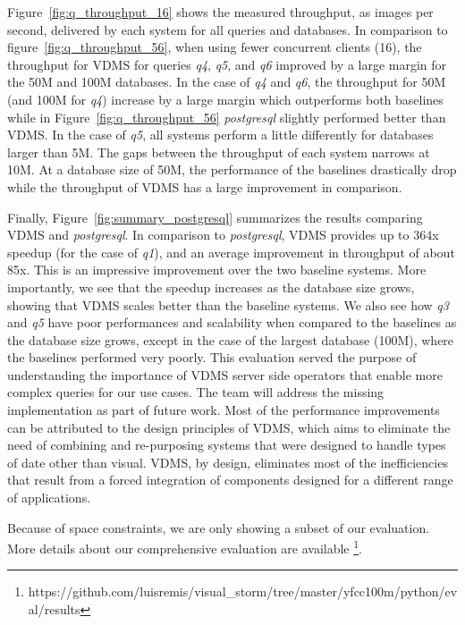 Figure~\ref{fig:q_throughput_16} shows the measured throughput,
as images per second, delivered by each system for all queries and databases.
In comparison to figure~\ref{fig:q_throughput_56},
when using fewer concurrent clients (16),
the throughput for VDMS for queries \textit{q4}, \textit{q5}, and \textit{q6}
improved by a large margin for the 50M and 100M databases.
In the case of \textit{q4} and \textit{q6},
the throughput for 50M (and 100M for \textit{q4})
increase by a large margin which outperforms both baselines while in
Figure~\ref{fig:q_throughput_56} \textit{postgresql} slightly performed better than VDMS.
In the case of \textit{q5}, all systems perform a little differently for databases
larger than 5M.
The gaps between the throughput of each system narrows at 10M.
At a database size of 50M, the performance of the baselines drastically drop
while the throughput of VDMS has a large improvement in comparison.





Finally, Figure~\ref{fig:summary_postgresql} summarizes the results
comparing VDMS and \textit{postgresql}.
In comparison to \textit{postgresql}, VDMS provides up to 364x speedup
(for the case of \textit{q1}),
and an average improvement in throughput of about 85x.
This is an impressive improvement over the two baseline systems.
More importantly, we see that the speedup increases as the database size grows,
showing that VDMS scales better than the baseline systems.
We also see how \textit{q3} and \textit{q5} have poor performances and scalability
when compared to the baselines as the database size grows, except in the
case of the largest database (100M), where the baselines performed very poorly.
This evaluation served the
purpose of understanding the importance of VDMS server side operators
that enable more complex queries for our use cases.
The team will address the missing implementation as part of future work.
Most of the performance improvements can be attributed to the design
principles of VDMS, which aims to eliminate the need of combining and
re-purposing systems that were designed to handle types of date other than visual.
VDMS, by design, eliminates most of the inefficiencies that result
from a forced integration of components designed for a
different range of applications.

Because of space constraints, we are only showing a subset of our evaluation.
More details about our comprehensive evaluation are available
\footnote{https://github.com/luisremis/visual\_storm/tree/master/yfcc100m/python/eval/results}.

